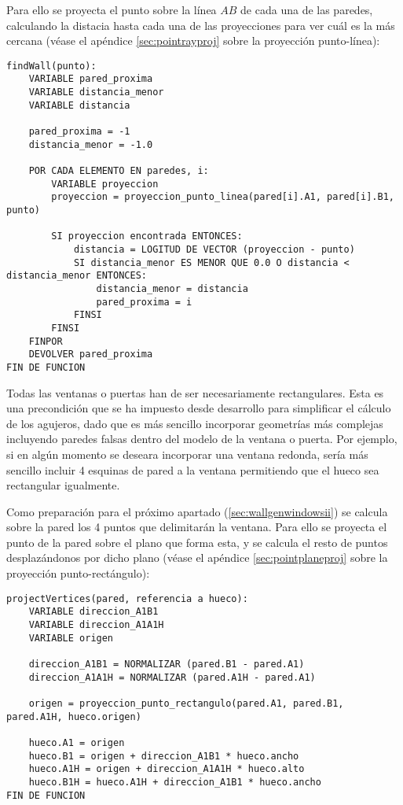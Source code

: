 Para ello se proyecta el punto sobre la línea $AB$ de cada una de las paredes, calculando la distacia hasta cada una de las proyecciones para ver cuál es la más cercana (véase el apéndice \ref{sec:pointrayproj} sobre la proyección punto-línea):

\begin{lstlisting}
findWall(punto):
    VARIABLE pared_proxima
    VARIABLE distancia_menor
    VARIABLE distancia
    
    pared_proxima = -1
    distancia_menor = -1.0
    
    POR CADA ELEMENTO EN paredes, i:
        VARIABLE proyeccion
        proyeccion = proyeccion_punto_linea(pared[i].A1, pared[i].B1, punto)
        
        SI proyeccion encontrada ENTONCES:
            distancia = LOGITUD DE VECTOR (proyeccion - punto)
            SI distancia_menor ES MENOR QUE 0.0 O distancia < distancia_menor ENTONCES:
                distancia_menor = distancia
                pared_proxima = i
            FINSI
        FINSI
    FINPOR
    DEVOLVER pared_proxima
FIN DE FUNCION
\end{lstlisting}

Todas las ventanas o puertas han de ser necesariamente rectangulares. Esta es una precondición que se ha impuesto desde desarrollo para simplificar el cálculo de los agujeros, dado que es más sencillo incorporar geometrías más complejas incluyendo paredes falsas dentro del modelo de la ventana o puerta. Por ejemplo, si en algún momento se deseara incorporar una ventana redonda, sería más sencillo incluir 4 esquinas de pared a la ventana permitiendo que el hueco sea rectangular igualmente.

Como preparación para el próximo apartado (\ref{sec:wallgenwindowsii}) se calcula sobre la pared los 4 puntos que delimitarán la ventana. Para ello se proyecta el punto de la pared sobre el plano que forma esta, y se calcula el resto de puntos desplazándonos por dicho plano (véase el apéndice \ref{sec:pointplaneproj} sobre la proyección punto-rectángulo):

\begin{lstlisting}
projectVertices(pared, referencia a hueco):
    VARIABLE direccion_A1B1
    VARIABLE direccion_A1A1H
    VARIABLE origen
    
    direccion_A1B1 = NORMALIZAR (pared.B1 - pared.A1)
    direccion_A1A1H = NORMALIZAR (pared.A1H - pared.A1)
    
    origen = proyeccion_punto_rectangulo(pared.A1, pared.B1, pared.A1H, hueco.origen)
    
    hueco.A1 = origen
    hueco.B1 = origen + direccion_A1B1 * hueco.ancho
    hueco.A1H = origen + direccion_A1A1H * hueco.alto
    hueco.B1H = hueco.A1H + direccion_A1B1 * hueco.ancho
FIN DE FUNCION
\end{lstlisting}

